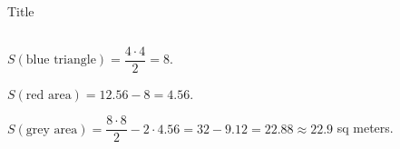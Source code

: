\documentclass[9pt,aspectratio=169]{beamer}
\begin{document}
\begin{frame}{Title}
\begin{columns}[T]
\begin{column}{0.5\textwidth}
      $S(\text{blue triangle}) = \dfrac{4\cdot 4}{2} = 8$.
      
      $S(\text{red area}) = 12.56 - 8 = 4.56$.

      $S(\text{grey area}) = \dfrac{8 \cdot 8}{2} - 2 \cdot 4.56 = 32 - 9.12 = 22.88 \approx \boxed{22.9}$ sq meters.
    \end{column}
    \begin{column}{0.5\textwidth}
    \end{column}
  \end{columns}
\end{frame}

\end{document}

